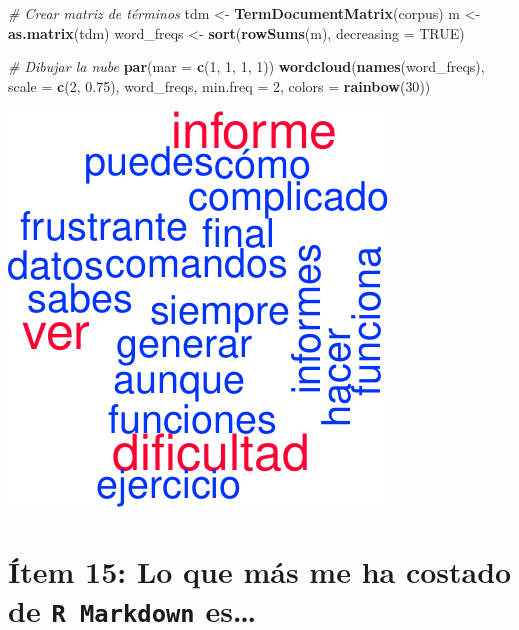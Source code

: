 \documentclass[
]{article}
\newenvironment{Shaded}{\begin{snugshade}}{\end{snugshade}}
\newcommand{\AttributeTok}[1]{\textcolor[rgb]{0.13,0.29,0.53}{#1}}
\newcommand{\CommentTok}[1]{\textcolor[rgb]{0.56,0.35,0.01}{\textit{#1}}}
\newcommand{\ConstantTok}[1]{\textcolor[rgb]{0.56,0.35,0.01}{#1}}
\newcommand{\DecValTok}[1]{\textcolor[rgb]{0.00,0.00,0.81}{#1}}
\newcommand{\FloatTok}[1]{\textcolor[rgb]{0.00,0.00,0.81}{#1}}
\newcommand{\FunctionTok}[1]{\textcolor[rgb]{0.13,0.29,0.53}{\textbf{#1}}}
\newcommand{\NormalTok}[1]{#1}
\newcommand{\OtherTok}[1]{\textcolor[rgb]{0.56,0.35,0.01}{#1}}
\begin{document}
\begin{Shaded}
\begin{Highlighting}[]
\CommentTok{\# Crear matriz de términos}
\NormalTok{tdm }\OtherTok{\textless{}{-}} \FunctionTok{TermDocumentMatrix}\NormalTok{(corpus)}
\NormalTok{m }\OtherTok{\textless{}{-}} \FunctionTok{as.matrix}\NormalTok{(tdm)}
\NormalTok{word\_freqs }\OtherTok{\textless{}{-}} \FunctionTok{sort}\NormalTok{(}\FunctionTok{rowSums}\NormalTok{(m), }\AttributeTok{decreasing =} \ConstantTok{TRUE}\NormalTok{)}

\CommentTok{\# Dibujar la nube}
\FunctionTok{par}\NormalTok{(}\AttributeTok{mar =} \FunctionTok{c}\NormalTok{(}\DecValTok{1}\NormalTok{, }\DecValTok{1}\NormalTok{, }\DecValTok{1}\NormalTok{, }\DecValTok{1}\NormalTok{))}
\FunctionTok{wordcloud}\NormalTok{(}\FunctionTok{names}\NormalTok{(word\_freqs), }\AttributeTok{scale =} \FunctionTok{c}\NormalTok{(}\DecValTok{2}\NormalTok{, }\FloatTok{0.75}\NormalTok{), word\_freqs, }\AttributeTok{min.freq =} \DecValTok{2}\NormalTok{, }
          \AttributeTok{colors =} \FunctionTok{rainbow}\NormalTok{(}\DecValTok{30}\NormalTok{))}
\end{Highlighting}
\end{Shaded}

\includegraphics{informe_files/figure-latex/unnamed-chunk-15-1.pdf}

\hypertarget{uxedtem-15-lo-que-muxe1s-me-ha-costado-de-es}{%
\section{\texorpdfstring{Ítem 15: Lo que más me ha costado de
\texttt{R Markdown}
es\ldots{}}{Ítem 15: Lo que más me ha costado de  es\ldots{}}}\label{uxedtem-15-lo-que-muxe1s-me-ha-costado-de-es}}
\end{document}

